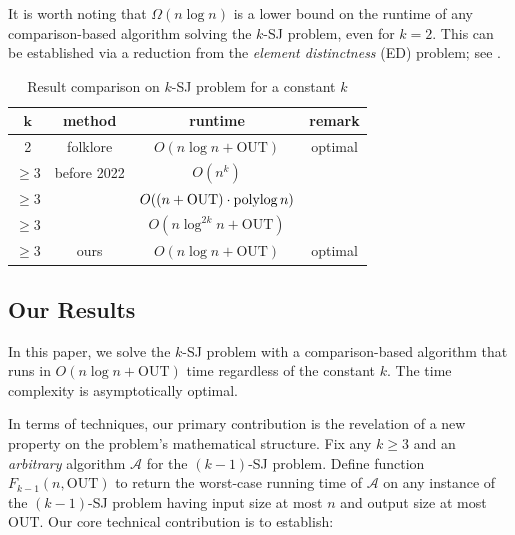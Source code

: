 \documentclass[sigconf]{acmart}
\def\vgap{\vspace{0mm}}
\def\figcapup{\vspace{-2mm}}
\def\figcapdown{\vspace{-2mm}}
\def\A{\mathcal{A}}
\def\out{\mathrm{OUT}}
\begin{document}
\vgap 

It is worth noting that $\Omega(n \log n)$ is a lower bound on the runtime of any comparison-based algorithm solving the $k$-SJ problem, even for $k = 2$. This can be established via a reduction from the {\em element distinctness} (ED) problem; see \cite{dl79}.


\begin{table} 
    \begin{tabular}{c|c|c|c} 
        $\bm{k}$ & {\bf method} & {\bf runtime} & {\bf remark} \\
        \hline\hline 
        2 & folklore & $O(n \log n + \out)$ & optimal \\ 
        \hline
        $\ge 3$ & before 2022 & $O(n^k)$ &  \\
        $\ge 3$ & \cite{ty22} & $O((n + \out) \cdot \polylog n)$ & \\
        $\ge 3$ & \cite{kcko22} & $O(n \log^{2k} n + \out)$ & \\
        \hline
        $\ge 3$ & ours & $O(n \log n + \out)$ & optimal
    \end{tabular}
    
    \vspace{3mm}
    \figcapup 
    \caption{Result comparison on $k$-SJ problem for a constant $k$}
    \label{tab:results-com}
    \figcapdown \vspace{-5mm}
\end{table}

\subsection{Our Results} \label{sec:intro:ours} 

In this paper, we solve the $k$-SJ problem with a comparison-based algorithm that runs in $O(n \log n + \out)$ time regardless of the constant $k$. The time complexity is asymptotically optimal.

\vgap 

In terms of techniques, our primary contribution is the revelation of a new property on the problem's mathematical structure. Fix any $k \ge 3$ and an {\em arbitrary} algorithm $\A$ for the $(k-1)$-SJ problem. Define function $F_{k-1}(n, \out)$ to return the worst-case running time of $\A$ on any instance of the $(k-1)$-SJ problem having input size at most $n$ and output size at most $\out$. Our core technical contribution is to establish:
\end{document}
